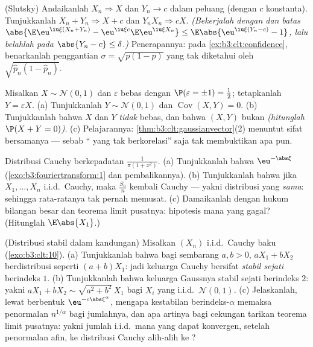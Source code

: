 \begin{exercise}[$\star\star\star$]\label{exo:b3:clt:8}
(Slutsky) Andaikanlah $X_n \Rightarrow X$ dan $Y_n \to c$ dalam
peluang (dengan $c$ konstanta). Tunjukkanlah $X_n + Y_n \Rightarrow X +
c$ dan $Y_nX_n \Rightarrow cX$. \emph{(Bekerjalah dengan
 dan batas $\abs{\E\eu^{\iu\xi
(X_n+Y_n)} - \eu^{\iu\xi c}\E\eu^{\iu\xi X_n}} \leq
\E\abs{\eu^{\iu\xi(Y_n - c)} - 1}$, lalu belahlah pada $\abs{Y_n - c}
\leq \delta$.)} Penerapannya: pada
\cref{ex:b3:clt:confidence}, benarkanlah penggantian
$\sigma = \sqrt{p(1-p)}$ yang tak diketahui oleh $\sqrt{\hat p_n(1 - \hat
p_n)}$.
\end{exercise}

\begin{exercise}[$\star\star\star$]\label{exo:b3:clt:9}
Misalkan $X \sim \mathcal N(0,1)$ dan $\varepsilon$ bebas
dengan $\P(\varepsilon = \pm1) = \frac12$; tetapkanlah $Y =
\varepsilon X$.
(a) Tunjukkanlah $Y \sim \mathcal N(0,1)$ dan
$\operatorname{Cov}(X, Y) = 0$.
(b) Tunjukkanlah bahwa $X$ dan $Y$ \emph{tidak} bebas, dan bahwa
$(X, Y)$ bukan  \emph{(hitunglah $\P(X + Y =
0)$)}.
(c) Pelajarannya: \cref{thm:b3:clt:gaussianvector}(2) menuntut
sifat  bersamanya --- sebab `` yang tak berkorelasi'' saja
tak membuktikan apa pun.
\end{exercise}

\begin{exercise}[$\star\star$]\label{exo:b3:clt:10}
Distribusi Cauchy berkepadatan $\frac1{\pi(1 + x^2)}$.
(a) Tunjukkanlah bahwa  $\eu^{-\abs\xi}$
(\cref{exo:b3:fouriertransform:1} dan pembalikannya).
(b) Tunjukkanlah bahwa jika $X_1, \dots, X_n$ i.i.d.\ Cauchy, maka
$\frac{S_n}n$ kembali Cauchy --- yakni distribusi yang \emph{sama}: sehingga
rata-ratanya tak pernah memusat.
(c) Damaikanlah dengan hukum bilangan besar dan teorema limit pusatnya:
hipotesis mana yang gagal? (Hitunglah $\E\abs{X_1}$.)
\end{exercise}

\begin{exercise}[$\star\star$]\label{exo:b3:clt:11}
(Distribusi stabil dalam kandungan) Misalkan $(X_n)$ i.i.d.\ Cauchy
baku (\cref{exo:b3:clt:10}).
(a) Tunjukkanlah bahwa bagi sembarang $a, b > 0$, $aX_1 + bX_2$ berdistribusi
seperti $(a + b)X_1$: jadi keluarga Cauchy bersifat \emph{stabil
sejati} berindeks $1$.
(b) Tunjukkanlah bahwa keluarga Gaussnya stabil sejati berindeks
$2$: yakni $aX_1 + bX_2 \sim \sqrt{a^2 + b^2}\,X_1$ bagi
$X_i$ yang i.i.d.\ $\mathcal N(0,1)$.
(c) Jelaskanlah, lewat  berbentuk
$\eu^{-c\abs\xi^\alpha}$, mengapa kestabilan berindeks-$\alpha$
memaksa penormalan $n^{1/\alpha}$ bagi jumlahnya, dan apa
artinya bagi cekungan tarikan teorema limit pusatnya: yakni jumlah
i.i.d.\ mana yang dapat konvergen, setelah penormalan afin, ke
distribusi Cauchy alih-alih ke ?
\end{exercise}

